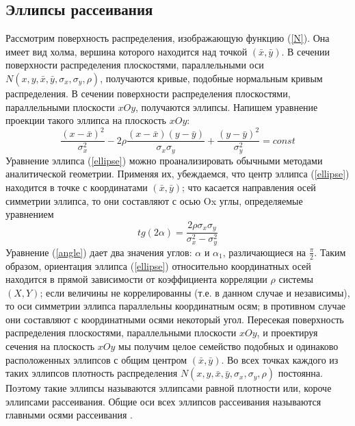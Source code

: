 \documentclass[../body.tex]{subfiles}
\begin{document}
	\subsection{Эллипсы рассеивания}
	Рассмотрим поверхность распределения, изображающую функцию (\ref{N}). Она имеет вид холма, вершина которого находится над точкой $(\bar{x},\bar{y})$.
	\newline
	В сечении поверхности распределения плоскостями, параллельными оси \\$N(x, y, \bar{x}, \bar{y}, \sigma_{x}, \sigma_{y}, \rho)$, получаются кривые, подобные нормальным кривым распределения. В сечении поверхности распределения плоскостями, параллельными плоскости $xOy$, получаются эллипсы. Напишем уравнение проекции такого эллипса на плоскость $xOy$: 
	\begin{equation}
		\frac{(x-\bar{x})^{2}}{\sigma_{x}^{2}} - 
		2\rho\frac{(x-\bar{x})(y-\bar{y})}{\sigma_{x}\sigma_{y}}+
		\frac{(y-\bar{y})^{2}}{\sigma_{y}^{2}} = const
		\label{ellipse}
	\end{equation}
	Уравнение эллипса (\ref{ellipse}) можно проанализировать обычными методами аналитической геометрии. Применяя их, убеждаемся, что центр эллипса (\ref{ellipse}) находится в точке с координатами $(\bar{x},\bar{y})$; что касается направления осей симметрии эллипса, то они составляют с осью Ox углы, определяемые уравнением
	\begin{equation}
		tg(2\alpha) = \frac{2\rho\sigma_{x}\sigma_{y}}{\sigma_{x}^{2} - \sigma_{y}^{2}}
		\label{angle}
	\end{equation}
	Уравнение (\ref{angle}) дает два значения углов: $\alpha$ и $\alpha_{1}$, различающиеся на $\frac{\pi}{2}$.
	\newline
	Таким образом, ориентация эллипса (\ref{ellipse}) относительно координатных осей находится в прямой зависимости от коэффициента корреляции $\rho$ системы $(X,Y)$; если величины не коррелированны (т.е. в данном случае и независимы), то оси симметрии эллипса параллельны координатным осям; в противном случае они составляют с координатными осями некоторый угол.
	\newline
	Пересекая поверхность распределения плоскостями, параллельными плоскости $xOy$, и проектируя сечения на плоскость $xOy$ мы получим целое семейство подобных и одинаково расположенных эллипсов с общим центром $(\bar{x},\bar{y})$. Во всех точках каждого из таких эллипсов плотность распределения $N(x, y, \bar{x}, \bar{y}, \sigma_{x}, \sigma_{y}, \rho)$ постоянна. Поэтому такие эллипсы называются эллипсами равной плотности или, короче эллипсами рассеивания. Общие оси всех эллипсов рассеивания называются главными осями рассеивания \cite[c.~193-194]{regr}.
\end{document}
